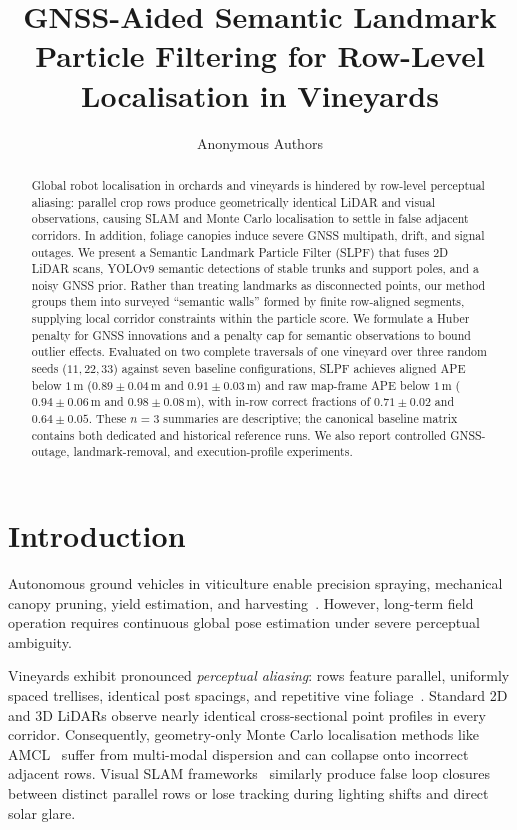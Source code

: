 \documentclass[letterpaper, 10 pt, conference]{ieeeconf}
\title{\LARGE \bf GNSS-Aided Semantic Landmark Particle Filtering for Row-Level Localisation in Vineyards}
\author{Anonymous Authors}
\begin{document}
\maketitle
\thispagestyle{empty}
\pagestyle{empty}

\begin{abstract}
Global robot localisation in orchards and vineyards is hindered by row-level perceptual aliasing: parallel crop rows produce geometrically identical LiDAR and visual observations, causing SLAM and Monte Carlo localisation to settle in false adjacent corridors. In addition, foliage canopies induce severe GNSS multipath, drift, and signal outages. We present a Semantic Landmark Particle Filter (SLPF) that fuses 2D LiDAR scans, YOLOv9 semantic detections of stable trunks and support poles, and a noisy GNSS prior. Rather than treating landmarks as disconnected points, our method groups them into surveyed ``semantic walls'' formed by finite row-aligned segments, supplying local corridor constraints within the particle score. We formulate a Huber penalty for GNSS innovations and a penalty cap for semantic observations to bound outlier effects.
Evaluated on two complete traversals of one vineyard over three random seeds ($11,22,33$) against seven baseline configurations, SLPF achieves aligned APE below $1\,$m ($0.89\pm0.04$\,m and $0.91\pm0.03$\,m) and raw map-frame APE below $1\,$m ($0.94\pm0.06$\,m and $0.98\pm0.08$\,m), with in-row correct fractions of $0.71\pm0.02$ and $0.64\pm0.05$. These $n=3$ summaries are descriptive; the canonical baseline matrix contains both dedicated and historical reference runs. We also report controlled GNSS-outage, landmark-removal, and execution-profile experiments.
\end{abstract}

\section{Introduction}
\label{sec:intro}

Autonomous ground vehicles in viticulture enable precision spraying, mechanical canopy pruning, yield estimation, and harvesting~\cite{aguiar2022localization,polvara2024bacchus,blok2019robot}. However, long-term field operation requires continuous global pose estimation under severe perceptual ambiguity.

Vineyards exhibit pronounced \emph{perceptual aliasing}: rows feature parallel, uniformly spaced trellises, identical post spacings, and repetitive vine foliage~\cite{papadimitriou2022loop,de2025keypoint,hroob2021benchmark}. Standard 2D and 3D LiDARs observe nearly identical cross-sectional point profiles in every corridor. Consequently, geometry-only Monte Carlo localisation methods like AMCL~\cite{amcl} suffer from multi-modal dispersion and can collapse onto incorrect adjacent rows. Visual SLAM frameworks~\cite{rtabmap,kokas2024multicamera} similarly produce false loop closures between distinct parallel rows or lose tracking during lighting shifts and direct solar glare.
\end{document}
